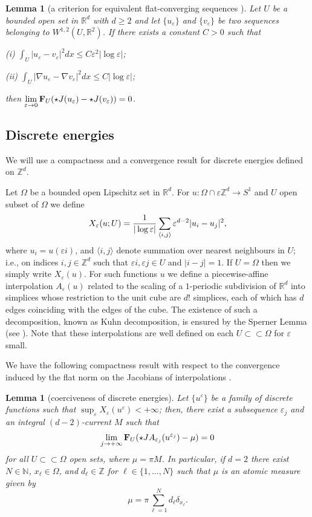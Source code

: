 \documentclass[11pt]{article}
\newtheorem{lemma}[definition]{Lemma}
\def\e{\varepsilon}
\begin{document}
\begin{lemma}[a criterion for equivalent flat-converging sequences {\cite[Lemma 1]{AC}}]\label{lemma1}
Let $U$ be a bounded open set in $\mathbb R^d$ with $d\geq 2$ and let $\{u_\e\}$ and $\{v_\e\}$ be two sequences
belonging to $W^{1,2}(U,\mathbb R^2)$. If there exists a constant $C>0$ such that

\smallskip
{\rm(i)} $\displaystyle \int_U|u_\e-v_\e|^2dx\le C\e^2|\log\e|$;

\smallskip
{\rm(ii)} $\displaystyle \int_U|\nabla u_\e-\nabla v_\e|^2dx\le C|\log\e|$;

\smallskip\noindent
then $\lim\limits_{\e\to0}{\bf F}_U (\star J(u_\e)-\star J(v_\e))=0$.
\end{lemma}

\subsection{Discrete energies}
We will use a compactness and a convergence result for discrete energies defined on $\mathbb Z^d$.

Let $\Omega$ be a bounded open Lipschitz set in $\mathbb R^d$.
For $u\colon\Omega\cap\e\mathbb Z^d\to S^1$ and $U$ open subset of $\Omega$ we define 
\begin{equation}
X_\e(u;U)={1\over|\log\e|}\sum_{\langle i,j\rangle}\e^{d-2}|u_i-u_j|^2,
\end{equation}
where $u_i=u(\e i)$, and $\langle i,j\rangle$ denote summation over nearest neighbours in $U$; i.e., on indices $i,j\in \mathbb Z^d$ such that $\e i,\e j\in U$ and $|i-j|=1$.
If $U=\Omega$ then we simply write $X_\e(u)$. For such functions $u$ we define a piecewise-affine interpolation $A_\e(u)$ related to the scaling of a $1$-periodic subdivision of $\mathbb R^d$ into 
simplices whose restriction to the unit cube are $d!$ simplices, each of which has $d$ edges coinciding with the edges of the cube. The existence of such a decomposition, known as Kuhn decomposition, is ensured by the Sperner Lemma (see \cite{kuhn}). 
Note that these interpolations are well defined on each $U\subset\subset\Omega$ for $\e$ small. 

We have the following compactness result with respect to the convergence induced by the flat norm on the Jacobians of interpolations \cite[Theorem 3]{AC}.

\begin{lemma}[coerciveness of discrete energies] \label{lemma2}
Let $\{u^\e\}$ be a family of discrete functions such that $\sup_\e X_\e(u^\e)<+\infty$; then, there exist a subsequence $\e_j$ and an integral $(d-2)$-current $M$   
such that 
\begin{equation}\label{codico}
\lim_{j\to +\infty}{\bf F}_U(\star JA_{\e_j}(u^{\e_j})-\mu)=0 
\end{equation}
for all $U\subset\subset\Omega$ open sets, where $\mu=\pi M$. 
In particular, if $d=2$ there exist $N\in \mathbb N$, $x_\ell\in \Omega$, and $d_\ell\in\mathbb Z$ for $\ell\in\{1,\ldots,N\}$ such that $\mu$ is an atomic measure given by 
$$\mu=\pi\sum_{\ell=1}^N d_\ell \delta_{x_\ell}.$$ 
\end{lemma}
\end{document}
